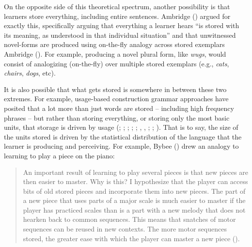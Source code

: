 \documentclass[
  12pt,
  letterpaper,
]{scrreprt}
\begin{document}
On the opposite side of this theoretical spectrum, another possibility
is that learners store everything, including entire sentences. Ambridge
() argued for
exactly this, specifically arguing that everything a learner hears ``is
stored with its meaning, as understood in that individual situation''
and that unwitnessed novel-forms are produced using on-the-fly analogy
across stored exemplars Ambridge
(). For
example, producing a novel plural form, like \emph{wugs}, would consist
of analogizing (on-the-fly) over multiple stored exemplars (e.g.,
\emph{cats}, \emph{chairs}, \emph{dogs}, etc).

It is also possible that what gets stored is somewhere in between these
two extremes. For example, usage-based construction grammar approaches
have posited that a lot more than just words are stored -- including
high frequency phrases -- but rather than storing everything, or storing
only the most basic units, that storage is driven by usage
(;
; ;
;
;
,
,
;
;
). That is to say, the size of the units stored is driven by the
statistical distribution of the language that the learner is producing
and perceiving. For example, Bybee () drew
an analogy to learning to play a piece on the piano:

\begin{quote}
An important result of learning to play several pieces is that new
pieces are then easier to master. Why is this? I hypothesize that the
player can access bits of old stored pieces and incorporate them into
new pieces. The part of a new piece that uses parts of a major scale is
much easier to master if the player has practiced scales than is a part
with a new melody that does not hearken back to common sequences. This
means that snatches of motor sequences can be reused in new contexts.
The more motor sequences stored, the greater ease with which the player
can master a new piece ().
\end{quote}
\end{document}

